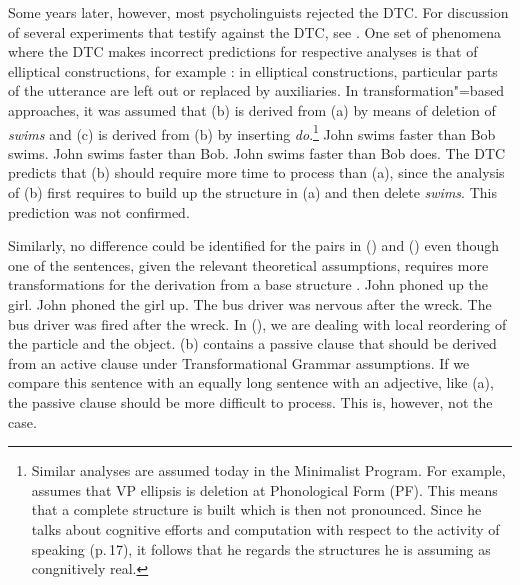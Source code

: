Some years later, however, most psycholinguists rejected the DTC. For discussion of several experiments that testify against
the DTC, see . One set of phenomena where the DTC makes incorrect predictions for respective analyses is that of elliptical constructions, for example
\citep*[]{FBG74a-u}: in elliptical constructions, particular parts of the utterance are left out or replaced by auxiliaries.
In transformation"=based approaches, it was assumed that (b) is derived from (a) by means of deletion of
\emph{swims} and (c) is derived from (b) by inserting \emph{do}.\footnote{%
  Similar analyses are assumed today in the Minimalist Program. For example, \citet[]{Trinh2011a} assumes that VP ellipsis is deletion at Phonological Form (PF). This means that
  a complete structure is built which is then not pronounced. Since he talks about cognitive efforts
  and computation with respect to the activity of speaking (p.\,17), it follows that he regards the
  structures he is assuming as congnitively real.
}
\eal
\ex John swims faster than Bob swims.
\ex John swims faster than Bob.
\ex John swims faster than Bob does.
\zl
The DTC predicts that (b) should require more time to process than (a),
since the analysis of (b) first requires to build up the structure in (a) and then delete \emph{swims}. This prediction was not confirmed.

Similarly, no difference could be identified for the pairs in () and () even though one of the sentences, given the relevant theoretical
assumptions, requires more
transformations for the derivation from a base structure \citep*[]{FBG74a-u}.
\eal
\ex John phoned up the girl.
\ex John phoned the girl up.
\zl
\eal
\ex The bus driver was nervous after the wreck.
\ex The bus driver was fired after the wreck.
\zl
In (), we are dealing with local reordering of the particle and the object. (b) contains a passive clause that
should be derived from an active clause under Transformational Grammar assumptions. If we compare this sentence with an equally long sentence
with an adjective, like (a), the passive clause should be more difficult to process. This is, however, not the case.

